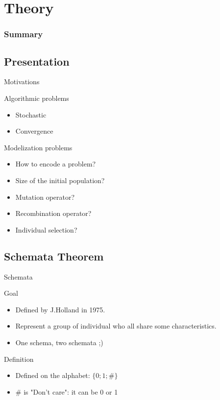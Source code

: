 \section{Theory}

\begin{frame}
  \frametitle{Summary}
  \tableofcontents[currentsection]
\end{frame}

\subsection{Presentation}

\begin{frame}{Motivations}
  \begin{block}{Algorithmic problems}
    \begin{itemize}
      \item Stochastic
      \item Convergence
    \end{itemize}
  \end{block}

  \begin{block}{Modelization problems}
    \begin{itemize}
      \item How to encode a problem?
      \item Size of the initial population?
      \item Mutation operator?
      \item Recombination operator?
      \item Individual selection?
    \end{itemize}
  \end{block}
\end{frame}

\subsection{Schemata Theorem}
\begin{frame}{Schemata}
  \begin{block}{Goal}
    \begin{itemize}
    \item Defined by J.Holland in 1975\cite{holland1992}.
    \item Represent a group of individual who all share some characteristics.
    \item One schema, two schemata ;)
    \end{itemize}
  \end{block}

  \begin{block}{Definition}
    \begin{itemize}
    \item Defined on the alphabet: $\{0;1;\#\}$
    \item $\#$ is "Don't care": it can be 0 or 1
    \end{itemize}
  \end{block}
\end{frame}

